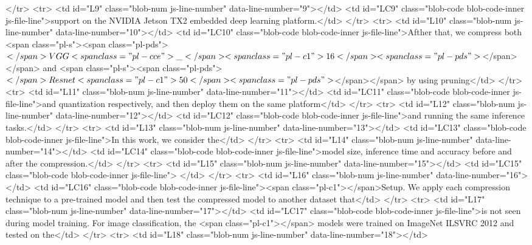       </tr>
      <tr>
        <td id="L9" class="blob-num js-line-number" data-line-number="9"></td>
        <td id="LC9" class="blob-code blob-code-inner js-file-line">support on the NVIDIA Jetson TX2 embedded deep learning platform.</td>
      </tr>
      <tr>
        <td id="L10" class="blob-num js-line-number" data-line-number="10"></td>
        <td id="LC10" class="blob-code blob-code-inner js-file-line">Afther that, we compress both <span class="pl-s"><span class="pl-pds">$</span>VGG<span class="pl-cce">\_</span><span class="pl-c1">16</span><span class="pl-pds">$</span></span> and <span class="pl-s"><span class="pl-pds">$</span>Resnet<span class="pl-c1">50</span><span class="pl-pds">$</span></span> by using pruning</td>
      </tr>
      <tr>
        <td id="L11" class="blob-num js-line-number" data-line-number="11"></td>
        <td id="LC11" class="blob-code blob-code-inner js-file-line">and quantization respectively, and then deploy them on the same platform</td>
      </tr>
      <tr>
        <td id="L12" class="blob-num js-line-number" data-line-number="12"></td>
        <td id="LC12" class="blob-code blob-code-inner js-file-line">and running the same inference tasks.</td>
      </tr>
      <tr>
        <td id="L13" class="blob-num js-line-number" data-line-number="13"></td>
        <td id="LC13" class="blob-code blob-code-inner js-file-line">In this work, we consider the</td>
      </tr>
      <tr>
        <td id="L14" class="blob-num js-line-number" data-line-number="14"></td>
        <td id="LC14" class="blob-code blob-code-inner js-file-line">model size, inference time and accuracy before and after the compression.</td>
      </tr>
      <tr>
        <td id="L15" class="blob-num js-line-number" data-line-number="15"></td>
        <td id="LC15" class="blob-code blob-code-inner js-file-line">
</td>
      </tr>
      <tr>
        <td id="L16" class="blob-num js-line-number" data-line-number="16"></td>
        <td id="LC16" class="blob-code blob-code-inner js-file-line"><span class="pl-c1">\cparagraph</span>{Setup.} We apply each compression technique to a pre-trained model and then test the compressed model to another dataset that</td>
      </tr>
      <tr>
        <td id="L17" class="blob-num js-line-number" data-line-number="17"></td>
        <td id="LC17" class="blob-code blob-code-inner js-file-line">is not seen during model training. For image classification, the <span class="pl-c1">\CNN</span> models were trained on ImageNet ILSVRC 2012 and tested on the</td>
      </tr>
      <tr>
        <td id="L18" class="blob-num js-line-number" data-line-number="18"></td>

